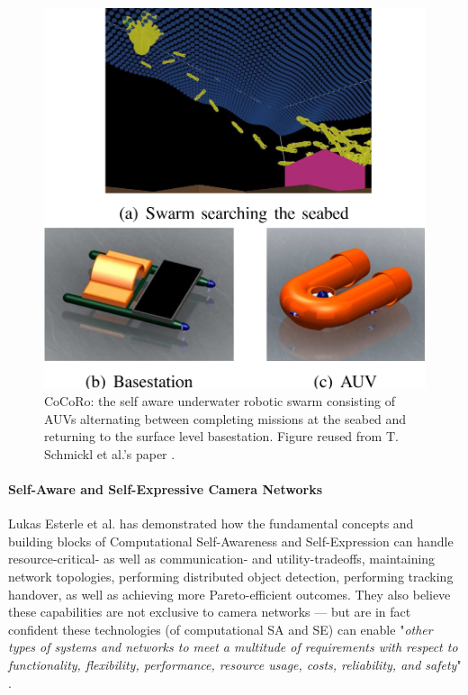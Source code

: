 			\begin{figure}[!ht]
			\centering
			\includegraphics[width=0.65\columnwidth]{Assets/DocSegments/Chapters/Background/Figures/Schema/cocoro.PNG}
			\caption[CoCoRo: the self aware underwater robotic AUV swarm.]{CoCoRo: the self aware underwater robotic swarm consisting of AUVs alternating between completing missions at the seabed and returning to the surface level basestation. Figure reused from T. Schmickl et al.'s paper \cite{cocoro}.}
			\label{fig:cocoro}
			\end{figure}

			\paragraph{Self-Aware and Self-Expressive Camera Networks \nl}

			Lukas Esterle et al. \cite{sa_and_se_camera_networks} has demonstrated how the fundamental concepts and building blocks of Computational Self-Awareness and Self-Expression can handle resource-critical- as well as communication- and utility-tradeoffs, maintaining network topologies, performing distributed object detection, performing tracking handover, as well as achieving more Pareto-efficient outcomes. They also believe these capabilities are not exclusive to camera networks — but are in fact confident these technologies (of computational SA and SE) can enable "\textit{other types of systems and networks to meet a multitude of requirements with respect to functionality, flexibility, performance, resource usage, costs, reliability, and safety}" \cite{sa_and_se_camera_networks}.
			



